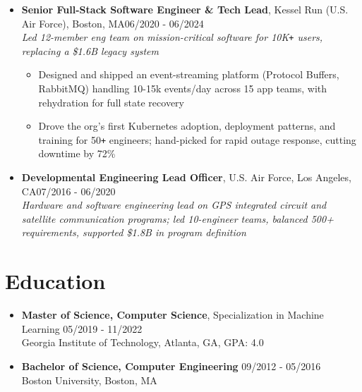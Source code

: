 \documentclass[10pt]{extarticle}
\begin{document}
\begin{itemize}
    \item \textbf{Senior Full-Stack Software Engineer \& Tech Lead}, Kessel Run (U.S. Air Force), Boston, MA\hfill 06/2020 - 06/2024 \\ \emph{Led 12-member eng team on mission-critical software for 10K\texttt{+} users, replacing a \$1.6B legacy system}
    \begin{itemize}
        \itemsep0em
        \item Designed and shipped an event-streaming platform (Protocol Buffers, RabbitMQ) handling 10-15k events/day across 15 app teams, with rehydration for full state recovery
        \item Drove the org's first Kubernetes adoption, deployment patterns, and training for 50\verb!+! engineers; hand-picked for rapid outage response, cutting downtime by 72\%
    \end{itemize}

    \item \textbf{Developmental Engineering Lead Officer}, U.S. Air Force, Los Angeles, CA\hfill 07/2016 - 06/2020 \\ \emph{Hardware and software engineering lead on GPS integrated circuit and satellite communication programs; led 10-engineer teams, balanced 500+ requirements, supported \$1.8B in program definition}

    \end{itemize}


\section{Education} \begin{itemize}
    \itemsep0.1em
    \item \textbf{Master of Science, Computer Science}, Specialization in Machine Learning \hfill 05/2019 - 11/2022\\Georgia Institute of Technology, Atlanta, GA, GPA: 4.0
    \item \textbf{Bachelor of Science, Computer Engineering} \hfill 09/2012 - 05/2016\\Boston University, Boston, MA  \end{itemize}

\end{document}
